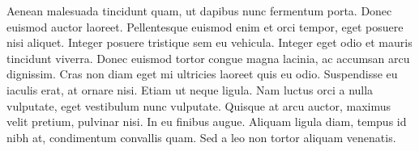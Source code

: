 Aenean malesuada tincidunt quam, ut dapibus nunc fermentum porta. Donec euismod auctor laoreet. Pellentesque euismod enim et orci tempor, eget posuere nisi aliquet. Integer posuere tristique sem eu vehicula. Integer eget odio et mauris tincidunt viverra. Donec euismod tortor congue magna lacinia, ac accumsan arcu dignissim. Cras non diam eget mi ultricies laoreet quis eu odio. Suspendisse eu iaculis erat, at ornare nisi. Etiam ut neque ligula. Nam luctus orci a nulla vulputate, eget vestibulum nunc vulputate. Quisque at arcu auctor, maximus velit pretium, pulvinar nisi. In eu finibus augue. Aliquam ligula diam, tempus id nibh at, condimentum convallis quam. Sed a leo non tortor aliquam venenatis.